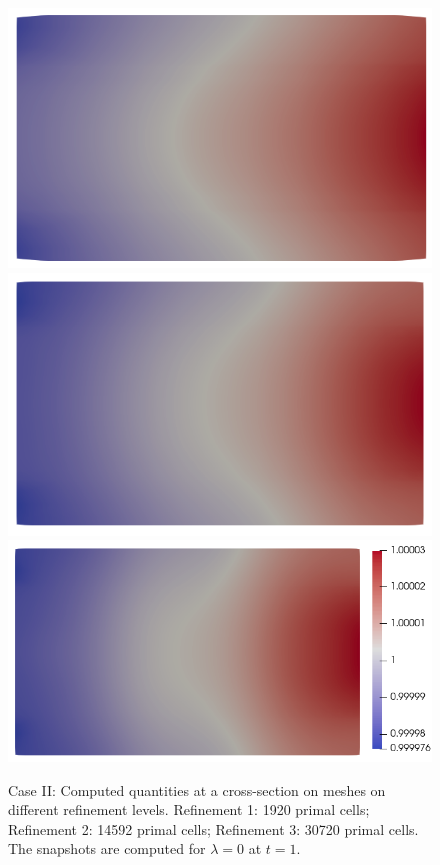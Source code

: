 \documentclass{article}
\begin{document}
\begin{figure}
\begin{minipage}{0.9\textwidth}
    \hspace{0.04cm}
    \includegraphics[scale=0.27]{slice_ni_T-1_lambda-0_8-2-2.png}\hspace{0.04cm}
    \includegraphics[scale=0.27]{slice_ni_T-1_lambda-0_16-3-3.png}\hspace{0.04cm}
    \includegraphics[scale=0.27]{slice_ni_T-1_lambda-0_32-3-4.png}
    \end{minipage}
    
    \caption{Case II: Computed quantities at a cross-section on meshes on different
      refinement levels. Refinement 1: 1920 primal cells; Refinement 2: 14592 primal
      cells; Refinement 3: 30720 primal cells. The snapshots are computed for
      \colorbox{yellow!30}{$\lambda = 0$} at $t = 1$.}
    \label{fig:grid_study_3d_clip_lambda-0}
\end{figure}
\end{document}
